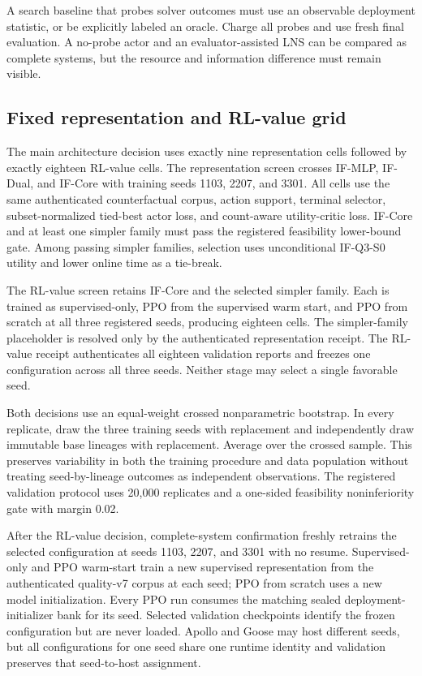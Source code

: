 \documentclass[11pt,a4paper]{article}
\theoremstyle{definition}\newtheorem{definition}[proposition]{Definition}
\begin{document}
A search baseline that probes solver outcomes must use an observable deployment statistic, or be explicitly labeled an oracle. Charge all probes and use fresh final evaluation. A no-probe actor and an evaluator-assisted LNS can be compared as complete systems, but the resource and information difference must remain visible.

\subsection{Fixed representation and RL-value grid}
The main architecture decision uses exactly nine representation cells followed by exactly eighteen RL-value cells. The representation screen crosses IF-MLP, IF-Dual, and IF-Core with training seeds 1103, 2207, and 3301. All cells use the same authenticated counterfactual corpus, action support, terminal selector, subset-normalized tied-best actor loss, and count-aware utility-critic loss. IF-Core and at least one simpler family must pass the registered feasibility lower-bound gate. Among passing simpler families, selection uses unconditional IF-Q3-S0 utility and lower online time as a tie-break.

The RL-value screen retains IF-Core and the selected simpler family. Each is trained as supervised-only, PPO from the supervised warm start, and PPO from scratch at all three registered seeds, producing eighteen cells. The simpler-family placeholder is resolved only by the authenticated representation receipt. The RL-value receipt authenticates all eighteen validation reports and freezes one configuration across all three seeds. Neither stage may select a single favorable seed.

Both decisions use an equal-weight crossed nonparametric bootstrap. In every replicate, draw the three training seeds with replacement and independently draw immutable base lineages with replacement. Average over the crossed sample. This preserves variability in both the training procedure and data population without treating seed-by-lineage outcomes as independent observations. The registered validation protocol uses 20,000 replicates and a one-sided feasibility noninferiority gate with margin 0.02.

After the RL-value decision, complete-system confirmation freshly retrains the selected configuration at seeds 1103, 2207, and 3301 with no resume. Supervised-only and PPO warm-start train a new supervised representation from the authenticated quality-v7 corpus at each seed; PPO from scratch uses a new model initialization. Every PPO run consumes the matching sealed deployment-initializer bank for its seed. Selected validation checkpoints identify the frozen configuration but are never loaded. Apollo and Goose may host different seeds, but all configurations for one seed share one runtime identity and validation preserves that seed-to-host assignment.
\end{document}
